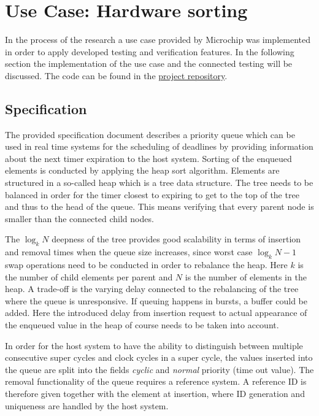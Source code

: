 \documentclass[conference]{IEEEtran}
\begin{document}
\section{Use Case: Hardware sorting}

In the process of the research a use case provided by Microchip was implemented in order to apply developed testing and verification features.
In the following section the implementation of the use case and the connected testing will be discussed. The code can be found in the 
\href{https://github.com/chisel-uvm/chisel-verify/tree/master/src/main/scala/heappriorityqueue}{project repository}.

\subsection{Specification}

The provided specification document describes a priority queue which can be used in real time systems for the scheduling of deadlines by providing information about the 
next timer expiration to the host system. Sorting of the enqueued elements is conducted by applying the heap sort algorithm. Elements are structured in a so-called 
heap which is a tree data structure. The tree needs to be balanced in order for the
timer closest to expiring to get to the top of the tree and thus to the head of the queue. This means verifying that every parent node is smaller than the connected child nodes.


The $\log_k N$ deepness of the tree provides good scalability in terms of insertion and removal times when the queue size increases, 
since worst case $\log_k N-1$ swap operations need to be conducted in order to rebalance the heap. Here $k$ is the number of child elements per parent and $N$
is the number of elements in the heap. A trade-off is the varying delay connected to the rebalancing of the tree where the queue is unresponsive. If queuing
happens in bursts, a buffer could be added. Here the introduced delay from insertion request to actual appearance of the enqueued value in the heap of course needs
to be taken into account.

In order for the host system to have the ability to distinguish between multiple consecutive super cycles and clock cycles in a super cycle, the values inserted 
into the queue are split into the fields \textit{cyclic} and \textit{normal} priority (time out value). The removal functionality of the queue requires a reference system. A reference 
ID is therefore given together with the element at insertion, where ID generation and uniqueness are handled by the host system.
\end{document}
